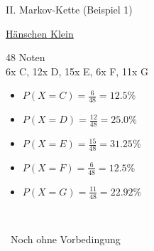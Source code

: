 \begin{frame}{II. \dimTwoTitle}{Markov-Kette (Beispiel 1)}
	
	\parbox{.6\textwidth}{
		\centering
		\underline{Hänschen Klein}
	}
	\parbox{.39\textwidth}{
		48 Noten\\
		6x C, 12x D, 15x E, 6x F, 11x G\\
		
		\begin{itemize}
			\item $P(X=C) = \frac{6}{48} = 12.5\%$
			\item $P(X=D) = \frac{12}{48} = 25.0\%$
			\item $P(X=E) = \frac{15}{48} = 31.25\%$
			\item $P(X=F) = \frac{6}{48} = 12.5\%$
			\item $P(X=G) = \frac{11}{48} = 22.92\%$
		\end{itemize}
	}

	\hfill \Conclude~\,
	
	\medskip
	\hfill \warnSign~Noch ohne Vorbedingung
	
\end{frame}

